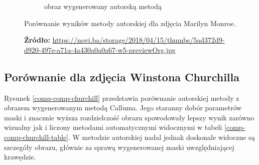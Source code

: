 \begin{figure}[H]
\begin{subfigure}{0.49\textwidth}
            \caption{obraz wygenerowany autorską metodą}
            \label{comp-comp-monroe-d}
        \end{subfigure}
        \caption{Porównanie wyników metody autorskiej dla zdjęcia Marilyn Monroe.}
        \caption*{\footnotesize{\textbf{Źródło:} {\url{https://novi.ba/storage/2018/04/15/thumbs/5ad372d9-d920-497e-a71a-4a430a0a0a67-w5-previewOrg.jpg}}}}
        \label{comp-comp-monroe}
        \end{figure}
    
        \subsection{Porównanie dla zdjęcia Winstona Churchilla}
        Rysunek \ref{comp-comp-churchill} przedstawia porównanie autorskiej metody z obrazem wygenerowanym metodą Calluma. Jego staranny dobór parametrów maski i znacznie wyższa rozdzielczość obrazu spowodowały lepszy wynik zarówno wizualny jak i liczony metodami automatycznymi widocznymi w tabeli \ref{comp-comp-churchill-table}. W metodzie autorskiej nadal jednak doskonale widoczne są szczegóły obrazu, głównie za sprawą wygenerowanej maski uwzględniającej krawędzie.
